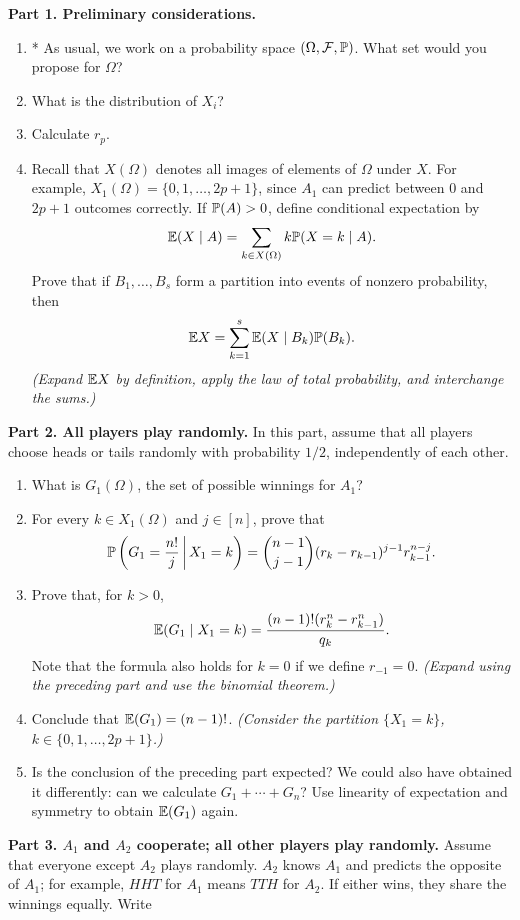 \documentclass[11pt,a4paper]{article}
\begin{document}
\begin{problem}[5 points]
\textbf{Part 1. Preliminary considerations.}
\begin{enumerate}
\item * As usual, we work on a probability space $(\Omega,\mathcal F,\P)$.
What set would you propose for $\Omega$?
\item What is the distribution of $X_i$?
\item Calculate $r_p$.
\item Recall that $X(\Omega)$ denotes all images of elements of $\Omega$ under $X$.
For example, $X_1(\Omega)=\{0,1,\ldots,2p+1\}$, since $A_1$ can predict between
0 and $2p+1$ outcomes correctly. If $\P(A)>0$, define conditional expectation by
\[\E(X\mid A)=\sum_{k\in X(\Omega)}k\P(X=k\mid A).\]
Prove that if $B_1,\ldots,B_s$ form a partition into events of nonzero probability, then
\[\E X=\sum_{k=1}^s\E(X\mid B_k)\P(B_k).\]
\emph{(Expand $\E X$ by definition, apply the law of total probability, and interchange the sums.)}
\end{enumerate}
\textbf{Part 2. All players play randomly.} In this part, assume that all players
choose heads or tails randomly with probability $1/2$, independently of each other.
\begin{enumerate}
\item What is $G_1(\Omega)$, the set of possible winnings for $A_1$?
\item For every $k\in X_1(\Omega)$ and $j\in[n]$, prove that
\[\P\left(G_1=\frac{n!}{j}\,\middle|\,X_1=k\right)
=\binom{n-1}{j-1}(r_k-r_{k-1})^{j-1}r_{k-1}^{n-j}.\]
\item Prove that, for $k>0$,
\[\E(G_1\mid X_1=k)=\frac{(n-1)!(r_k^n-r_{k-1}^n)}{q_k}.\]
Note that the formula also holds for $k=0$ if we define $r_{-1}=0$.
\emph{(Expand using the preceding part and use the binomial theorem.)}
\item Conclude that $\E(G_1)=(n-1)!$.
\emph{(Consider the partition $\{X_1=k\}$, $k\in\{0,1,\ldots,2p+1\}$.)}
\item Is the conclusion of the preceding part expected? We could also have
obtained it differently: can we calculate $G_1+\cdots+G_n$? Use linearity of
expectation and symmetry to obtain $\E(G_1)$ again.
\end{enumerate}
\textbf{Part 3. $A_1$ and $A_2$ cooperate; all other players play randomly.}
Assume that everyone except $A_2$ plays randomly. $A_2$ knows $A_1$ and predicts
the opposite of $A_1$; for example, $HHT$ for $A_1$ means $TTH$ for $A_2$.
If either wins, they share the winnings equally. Write
\begin{itemize}

\end{itemize}
\end{problem}
\end{document}
